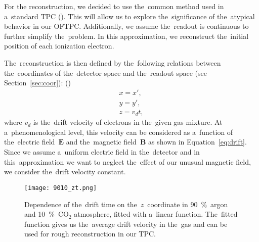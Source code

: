 		For the reconstruction, we decided to use the~common method used in a~standard \ac{TPC} (). This will allow us to explore the~significance of the~atypical behavior in our \ac{OFTPC}. Additionally, we assume the~readout is continuous to further simplify the~problem. In this approximation, we reconstruct the~initial position of each ionization electron.
		
		The~reconstruction is then defined by the~following relations between the~coordinates of the~detector space and the~readout space (see Section~\ref{sec:coor}): ()
			\begin{eqnarray}
				x = x',\\
				y = y',\\
				z = v_d t,
			\end{eqnarray}
		where $v_d$ is the~drift velocity of electrons in the~given gas mixture. At a~phenomenological level, this velocity can be considered as a~function of the~electric field~$\bm{E}$ and the~magnetic field~$\bm{B}$ as shown in Equation~\ref{eq:drift}.  Since we assume a~uniform electric field in the~detector and in this~approximation we want to neglect the~effect of our unusual magnetic field, we consider the~drift velocity constant. 
		
		
		\begin{figure}[H]
			\centering
			\texttt{[image: 9010\_zt.png]}
			\caption{Dependence of the~drift time on the~$z$~coordinate in 90~\%~argon and 10~\%~CO$_2$ atmosphere, fitted with a~linear function. The~fitted function gives us the~average drift velocity in the~gas and can be used for rough reconstruction in our \ac{TPC}. }
			\label{fig:9010zt}
		\end{figure}
		
